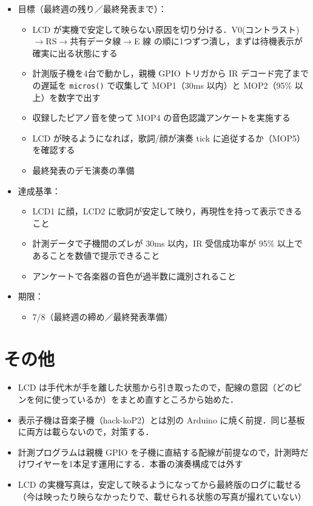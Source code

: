 \documentclass[a4paper,11pt]{ltjsarticle}
\providecommand{\％}{\%}
\begin{document}
\begin{itemize}
    \item 目標（最終週の残り／最終発表まで）：
    \begin{itemize}
        \item LCD が実機で安定して映らない原因を切り分ける．V0(コントラスト)$\to$RS$\to$共有データ線$\to$E 線 の順に1つずつ潰し，まずは待機表示が確実に出る状態にする
        \item 計測版子機を4台で動かし，親機 GPIO トリガから IR デコード完了までの遅延を \texttt{micros()} で収集して MOP1（30ms 以内）と MOP2（95\% 以上）を数字で出す
        \item 収録したピアノ音を使って MOP4 の音色認識アンケートを実施する
        \item LCD が映るようになれば，歌詞/顔が演奏 tick に追従するか（MOP5）を確認する
        \item 最終発表のデモ演奏の準備
    \end{itemize}
    \item 達成基準：
    \begin{itemize}
        \item LCD1 に顔，LCD2 に歌詞が安定して映り，再現性を持って表示できること
        \item 計測データで子機間のズレが 30ms 以内，IR 受信成功率が 95\% 以上であることを数値で提示できること
        \item アンケートで各楽器の音色が過半数に識別されること
    \end{itemize}
    \item 期限：
    \begin{itemize}
        \item 7/8（最終週の締め／最終発表準備）
    \end{itemize}
\end{itemize}

\section{その他}\label{sec:other}

\begin{itemize}
    \item LCD は手代木が手を離した状態から引き取ったので，配線の意図（どのピンを何に使っているか）をまとめ直すところから始めた．
    \item 表示子機は音楽子機（hack-koP2）とは別の Arduino に焼く前提．同じ基板に両方は載らないので，対策する．
    \item 計測プログラムは親機 GPIO を子機に直結する配線が前提なので，計測時だけワイヤーを1本足す運用にする．本番の演奏構成では外す
    \item LCD の実機写真は，安定して映るようになってから最終版のログに載せる（今は映ったり映らなかったりで、載せられる状態の写真が撮れていない）
\end{itemize}
\end{document}
